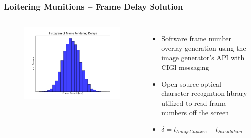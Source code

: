 \documentclass[aspectratio=169]{beamer}
\begin{document}
\begin{frame}
  \frametitle{Loitering Munitions -- Frame Delay Solution}  
  \begin{columns}[t]            %
    \begin{figure}
      \includegraphics[width=\textwidth]{DelayHistogram.png}
    \end{figure}
    
    \begin{itemize}
    \item Software frame number overlay generation using the image
      generator's API with CIGI messaging
    \item Open source optical character recognition library utilized
      to read frame numbers off the screen
      \item $\delta=t_{Image Capture} - t_{Simulation}$
    \end{itemize}
  \end{columns}
\end{frame}
\end{document}
